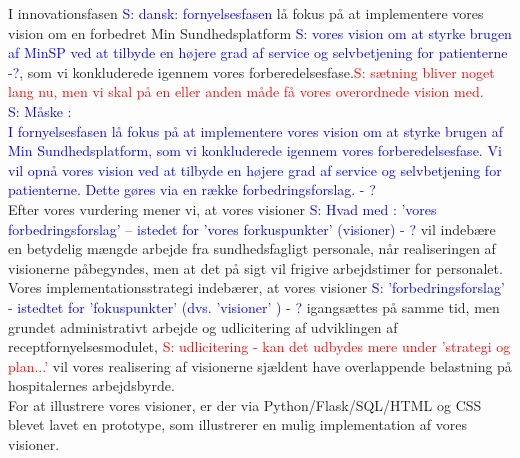 I innovationsfasen 
\textcolor{blue}{S: dansk: fornyelsesfasen} lå fokus på at implementere  
vores vision om en forbedret Min Sundhedsplatform
\textcolor{blue}{S: vores vision om at styrke brugen af MinSP ved at tilbyde en højere grad af service og selvbetjening for patienterne -?}, som vi konkluderede igennem vores forberedelsesfase.\textcolor{red}{S: sætning bliver noget lang nu, men vi skal på en eller anden måde få vores overordnede vision med.\\ }
\textcolor{blue}{S: Måske : \\
I fornyelsesfasen lå fokus på at implementere vores vision om at styrke brugen af Min Sundhedsplatform, som vi konkluderede igennem vores forberedelsesfase. Vi vil opnå vores vision ved at tilbyde en højere grad af service og selvbetjening for patienterne. Dette gøres via en række forbedringsforslag.  - ?  }\\
Efter vores vurdering mener vi, at vores visioner 
\textcolor{blue}{S: Hvad med  : 'vores forbedringsforslag' -- istedet for 'vores forkuspunkter' (visioner) - ?}
 vil indebære en betydelig mængde arbejde fra sundhedsfagligt personale, når realiseringen af visionerne påbegyndes, men at det på sigt vil frigive arbejdstimer for personalet.\\
Vores implementationsstrategi indebærer, at vores visioner 
\textcolor{blue}{S: 'forbedringsforslag' - istedtet for 'fokuspunkter' (dvs. 'visioner' ) - ?}
 igangsættes på samme tid, men grundet administrativt arbejde og udlicitering af udviklingen af receptfornyelsesmodulet,
 \textcolor{red}{S: udlicitering - kan det udbydes mere under 'strategi og plan...'}
 vil vores realisering af visionerne sjældent have overlappende belastning på hospitalernes arbejdsbyrde.\\
For at illustrere vores visioner, er der via Python/Flask/SQL/HTML og CSS blevet lavet en prototype, som illustrerer en mulig implementation af vores visioner.\\
